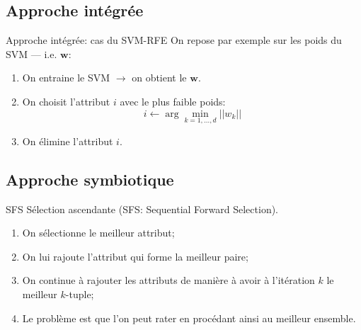 \documentclass[8pt]{beamer}
\begin{document}
	\subsection[integrated approach]{Approche intégrée}
	\begin{frame}{Approche intégrée: cas du SVM-RFE}
		On repose par exemple sur les poids du SVM --- i.e.  $ \textbf{w}$:
		\begin{enumerate}
			\item<1-> On entraine le SVM $\longrightarrow$ on obtient le $\textbf{w}$.
			\item<2-> On choisit l'attribut $i$ avec le plus faible poids:
			$$ i \leftarrow \arg \min_{k=1,\dots,d}{\vert\vert w_k\vert\vert}$$
			\item<3-> On élimine l'attribut $i$.
		\end{enumerate}
	\end{frame}

	\subsection[symbiotic approach]{Approche symbiotique}
	\begin{frame}{SFS}
		Sélection ascendante (SFS\@: Sequential Forward Selection).
		\begin{enumerate}
		\item<1-> On sélectionne le meilleur attribut;
		\item<2-> On lui rajoute l'attribut qui forme la meilleur paire;
		\item<3-> On continue à rajouter les attributs de manière à avoir à l'itération $k$ le meilleur $k$-tuple;
		\item <4-> Le problème est que l'on peut rater en procédant ainsi au meilleur ensemble.
		\end{enumerate}
	\end{frame}
\end{document}
